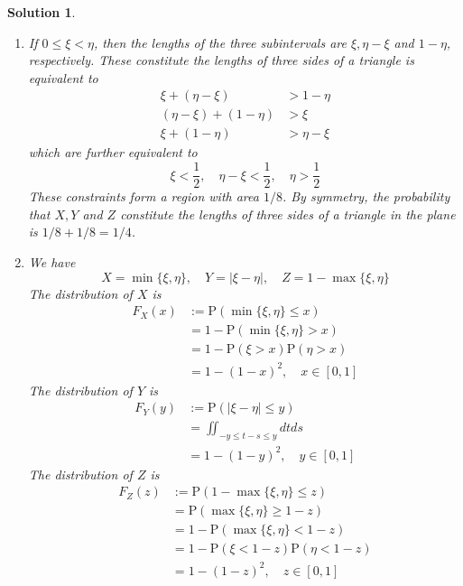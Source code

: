 \documentclass[12pt]{amsart}
\newtheorem*{solution}{Solution}
\begin{document}
\begin{solution}
\begin{enumerate}[label=(\alph*)]
\item If $0 \leq \xi<\eta$, then the lengths of the three subintervals are $\xi, \eta-\xi$ and $1-\eta$, respectively. These constitute the lengths of three sides of a triangle is equivalent to
\begin{align*}
\xi+(\eta-\xi) & >1-\eta \\
(\eta-\xi)+(1-\eta) & >\xi \\
\xi+(1-\eta) & >\eta-\xi
\end{align*}
which are further equivalent to
$$
\xi<\frac{1}{2}, \quad \eta-\xi<\frac{1}{2}, \quad \eta>\frac{1}{2}
$$
These constraints form a region with area $1 / 8$.
By symmetry, the probability that $X, Y$ and $Z$ constitute the lengths of three sides of a triangle in the plane is $1 / 8+1 / 8=1 / 4$.
\item We have
$$
X=\min \{\xi, \eta\}, \quad Y=|\xi-\eta|, \quad Z=1-\max \{\xi, \eta\}
$$
The distribution of $X$ is
\begin{align*}
F_X(x) & :=\mathrm{P}(\min \{\xi, \eta\} \leq x) \\
& =1-\mathrm{P}(\min \{\xi, \eta\}>x) \\
& =1-\mathrm{P}(\xi>x) \mathrm{P}(\eta>x) \\
& =1-(1-x)^2, \quad x \in[0,1]
\end{align*}
The distribution of $Y$ is
\begin{align*}
F_Y(y) & :=\mathrm{P}(|\xi-\eta| \leq y) \\
& =\iint_{-y \leq t-s \leq y} d t d s \\
& =1-(1-y)^2, \quad y \in[0,1]
\end{align*}
The distribution of $Z$ is
\begin{align*}
F_Z(z) & :=\mathrm{P}(1-\max \{\xi, \eta\} \leq z) \\
& =\mathrm{P}(\max \{\xi, \eta\} \geq 1-z) \\
& =1-\mathrm{P}(\max \{\xi, \eta\}<1-z) \\
& =1-\mathrm{P}(\xi<1-z) \mathrm{P}(\eta<1-z) \\
& =1-(1-z)^2, \quad z \in[0,1]
\end{align*}
\end{enumerate}
\end{solution}
\end{document}
